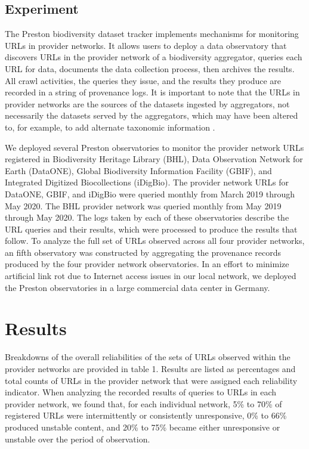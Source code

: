 \subsection*{Experiment}
The Preston biodiversity dataset tracker \citep{jorrit_poelen_2018_1410543} implements mechanisms for monitoring URLs in provider networks. It allows users to deploy a data observatory that discovers URLs in the provider network of a biodiversity aggregator, queries each URL for data, documents the data collection process, then archives the results. All crawl activities, the queries they issue, and the results they produce are recorded in a string of provenance logs. It is important to note that the URLs in provider networks are the sources of the datasets ingested by aggregators, not necessarily the datasets served by the aggregators, which may have been altered to, for example, to add alternate taxonomic information \citep{gbif_back_tax_2019}.

We deployed several Preston observatories to monitor the provider network URLs registered in Biodiversity Heritage Library (BHL), Data Observation Network for Earth (DataONE), Global Biodiversity Information Facility (GBIF), and Integrated Digitized Biocollections (iDigBio). The provider network URLs for DataONE, GBIF, and iDigBio were queried monthly from March 2019 through May 2020. The BHL provider network was queried monthly from May 2019 through May 2020. The logs taken by each of these observatories describe the URL queries and their results, which were processed to produce the results that follow. To analyze the full set of URLs observed across all four provider networks, an fifth observatory was constructed by aggregating the provenance records produced by the four provider network observatories. In an effort to minimize artificial link rot due to Internet access issues in our local network, we deployed the Preston observatories in a large commercial data center in Germany.


\section*{Results}
\label{sec:results}
Breakdowns of the overall reliabilities of the sets of URLs observed within the provider networks are provided in table 1. Results are listed as percentages and total counts of URLs in the provider network that were assigned each reliability indicator. When analyzing the recorded results of queries to URLs in each provider network, we found that, for each individual network, 5\% to 70\% of registered URLs were intermittently or consistently unresponsive, 0\% to 66\% produced unstable content, and 20\% to 75\% became either unresponsive or unstable over the period of observation.

